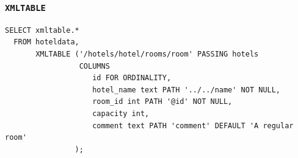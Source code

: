 \begin{frame}[fragile]
\frametitle{\texttt{XMLTABLE}}
\footnotesize
\begin{lstlisting}
SELECT xmltable.*
  FROM hoteldata,
       XMLTABLE ('/hotels/hotel/rooms/room' PASSING hotels
                 COLUMNS
                    id FOR ORDINALITY,
                    hotel_name text PATH '../../name' NOT NULL,
                    room_id int PATH '@id' NOT NULL,
                    capacity int,
                    comment text PATH 'comment' DEFAULT 'A regular room'
                );
\end{lstlisting}
\end{frame}
